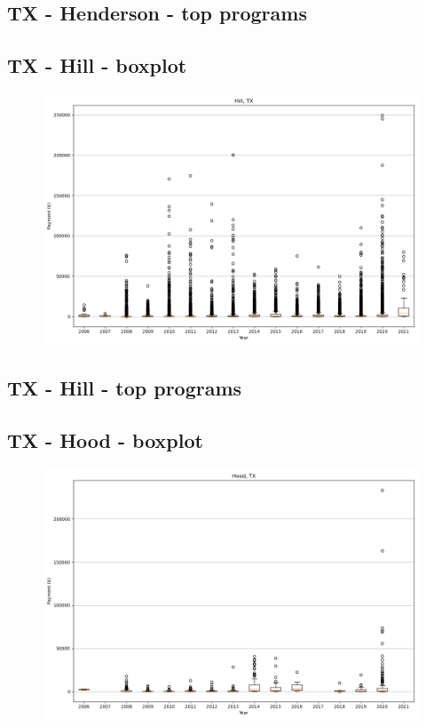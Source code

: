 \subsection*{TX - Henderson - top programs}

\newpage
\subsection*{TX - Hill - boxplot}
\begin{figure}[h]
\centering
\includegraphics[width=7in]{../output/boxplots/counties/Hill-TX_boxplot.png}
\end{figure}


\subsection*{TX - Hill - top programs}

\newpage
\subsection*{TX - Hood - boxplot}
\begin{figure}[h]
\centering
\includegraphics[width=7in]{../output/boxplots/counties/Hood-TX_boxplot.png}
\end{figure}


